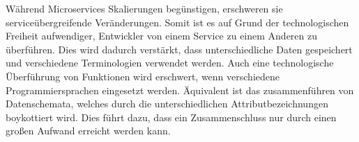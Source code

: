 Während Microservices Skalierungen begünstigen, erschweren sie serviceübergreifende Veränderungen. Somit ist es auf Grund der technologischen Freiheit aufwendiger, Entwickler von einem Service zu einem Anderen zu überführen. Dies wird dadurch verstärkt, dass unterschiedliche Daten gespeichert und verschiedene Terminologien verwendet werden. Auch eine technologische Überführung von Funktionen wird erschwert, wenn verschiedene Programmiersprachen eingesetzt werden. Äquivalent ist das zusammenführen von Datenschemata, welches durch die unterschiedlichen Attributbezeichnungen boykottiert wird. Dies führt dazu, dass ein Zusammenschluss nur durch einen großen Aufwand erreicht werden kann.

